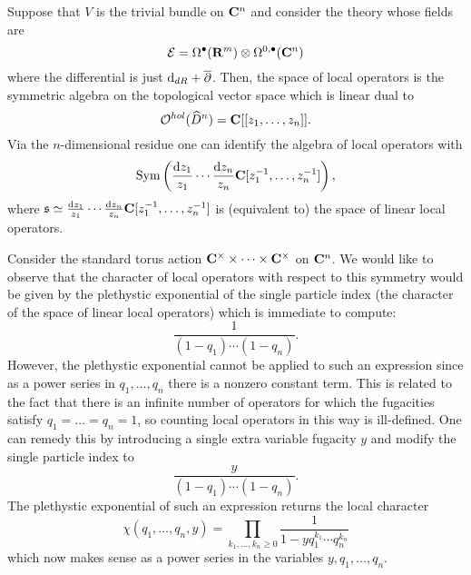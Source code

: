 \begin{eg}
Suppose that $V$ is the trivial bundle on $\mathbf{C}^n$ and consider the theory whose fields are
\[
\mathcal E = \Omega^\bullet(\mathbf{R}^m) \otimes \Omega^{0,\bullet}(\mathbf{C}^n) 
\]
where the differential is just ${\rm d}_{dR} + \overline{\partial}$. 
Then, the space of local operators is the symmetric algebra on the topological vector space which is linear dual to 
\[
\mathcal O^{hol}(\widehat{D}^n) = \mathbf{C}[[z_1,\ldots,z_n]] .
\]
Via the $n$-dimensional residue one can identify the algebra of local operators with 
\[
\operatorname{Sym}\left(\frac{{\rm d} z_1}{z_1} \cdots \frac{{\rm d} z_n}{z_n}  \mathbf{C}[z_1^{-1}, \ldots , z_n^{-1}]\right) ,
\]
where $\mathfrak{s} \simeq \frac{{\rm d} z_1}{z_1} \cdots \frac{{\rm d} z_n}{z_n}  \mathbf{C}[z_1^{-1}, \ldots , z_n^{-1}]$ is (equivalent to) the space of linear local operators. 

Consider the standard torus action $\mathbf{C}^\times \times \cdots \times \mathbf{C}^\times$ on $\mathbf{C}^n$. 
We would like to observe that the character of local operators with respect to this symmetry would be given by the plethystic exponential of the single particle index (the character of the space of linear local operators) which is immediate to compute:
\[
\frac{1}{(1-q_1)\cdots (1-q_n)} .
\]
However, the plethystic exponential cannot be applied to such an expression since as a power series in $q_1,\ldots,q_n$ there is a nonzero constant term.
This is related to the fact that there is an infinite number of operators for which the fugacities satisfy $q_1=\ldots=q_n=1$, so counting local operators in this way is ill-defined. 
One can remedy this by introducing a single extra variable fugacity $y$ and modify the single particle index to 
\[
\frac{y}{(1-q_1)\cdots (1-q_n)} .
\]
The plethystic exponential of such an expression returns the local character
\[
\chi(q_1,\ldots,q_n,y) = \prod_{k_1,\ldots,k_n \geq 0} \frac{1}{1-y q_1^{k_1}\cdots q_n^{k_n}}
\]
which now makes sense as a power series in the variables $y,q_1,\ldots,q_n$.
\end{eg}

